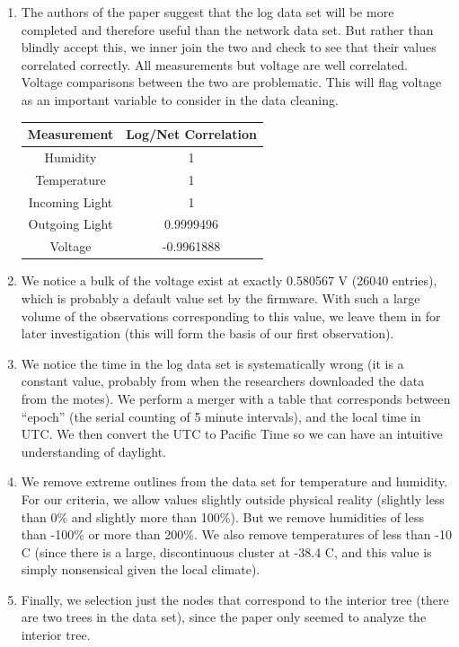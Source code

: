 \documentclass[english]{article}\usepackage[]{graphicx}\usepackage[]{color}
\begin{document}
\begin{enumerate}
\item The authors of the paper suggest that the log data set will be more completed 
and therefore useful than the network data set.  But rather than blindly accept this,
we inner join the two and check to see that their values correlated correctly.  All measurements
but voltage are well correlated.  Voltage comparisons between the two are problematic.
This will flag voltage as an important variable to consider in the data cleaning.

\begin{center}
\begin{tabular}{ c || c }
 Measurement & Log/Net Correlation \\ \hline
 Humidity & 1 \\
 Temperature & 1 \\
 Incoming Light & 1 \\
 Outgoing Light & 0.9999496 \\
 Voltage & -0.9961888 \\

\end{tabular}
\end{center}

\item We notice a bulk of the voltage exist at exactly 0.580567 V (26040 entries), which is probably a default value set by the firmware.  With such a large volume of the 
observations corresponding to this value, we leave them in for later investigation (this 
will form the basis of our first observation).
\item We notice the time in the log data set is systematically wrong (it is a constant value, 
probably from when the researchers downloaded the data from the motes).  We perform a merger
with a table that corresponds between ``epoch'' (the serial counting of 5 minute intervals),
and the local time in UTC.  We then convert the UTC to Pacific Time so we can have an 
intuitive understanding of daylight.
\item We remove extreme outlines from the data set for temperature and humidity.  For
our criteria, we allow values slightly outside physical reality (slightly less than 0\%
and slightly more than 100\%).  But we remove humidities of less than -100\% or more than 200\%.
We also remove temperatures of less than -10 C (since there is a large, discontinuous cluster at 
-38.4 C, and this value is simply nonsensical given the local climate).
\item Finally, we selection just the nodes that correspond to the interior tree (there are two 
trees in the data set), since the paper only seemed to analyze the interior tree.
\end{enumerate}
\end{document}
